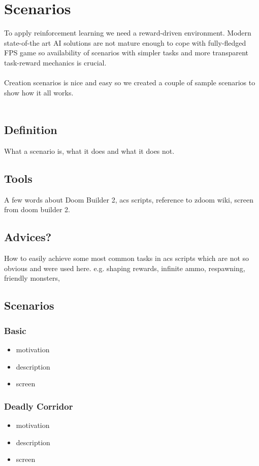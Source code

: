 
\chapter{Scenarios}

To apply reinforcement learning we need a reward-driven environment. Modern state-of-the art AI solutions are not mature enough to cope with fully-fledged FPS game so availability of scenarios with simpler tasks and more transparent task-reward mechanics is crucial.\\
\\
Creation scenarios is nice and easy so we created a couple of sample scenarios to show how it all works.\\
\\
\section{Definition}
What a scenario is, what it does and what it does not.

\section{Tools}
A few words about Doom Builder 2, acs scripts, reference to zdoom wiki, screen from doom builder 2.

\section{Advices?}
How to easily achieve some most common tasks in acs scripts which are not so obvious and were used here.
e.g. shaping rewards, infinite ammo, respawning, friendly monsters, 
\section{Scenarios}

\subsection{Basic}
\begin{itemize}
	\item motivation
	\item description
	\item screen
\end{itemize}

\subsection{Deadly Corridor}
\begin{itemize}
	\item motivation
	\item description
	\item screen
\end{itemize}

